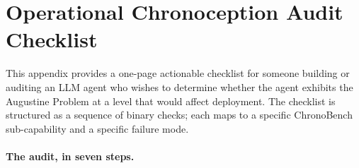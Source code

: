 
\section{Operational Chronoception Audit Checklist}
\label{app:audit-checklist}

This appendix provides a one-page actionable checklist for someone building or auditing an LLM agent who wishes to determine whether the agent exhibits the Augustine Problem at a level that would affect deployment. The checklist is structured as a sequence of binary checks; each maps to a specific ChronoBench sub-capability and a specific failure mode.

\paragraph{The audit, in seven steps.}

